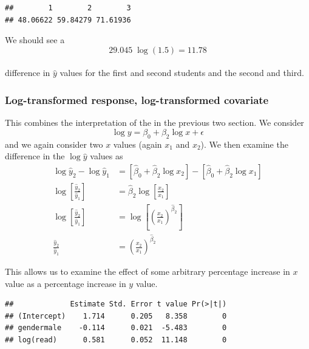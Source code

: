 \documentclass[]{book}
\newenvironment{Shaded}{\begin{snugshade}}{\end{snugshade}}
\newcommand{\KeywordTok}[1]{\textcolor[rgb]{0.13,0.29,0.53}{\textbf{{#1}}}}
\newcommand{\DataTypeTok}[1]{\textcolor[rgb]{0.13,0.29,0.53}{{#1}}}
\newcommand{\DecValTok}[1]{\textcolor[rgb]{0.00,0.00,0.81}{{#1}}}
\newcommand{\StringTok}[1]{\textcolor[rgb]{0.31,0.60,0.02}{{#1}}}
\newcommand{\NormalTok}[1]{{#1}}
\theoremstyle{definition}
\theoremstyle{definition}
\theoremstyle{remark}
\begin{document}
\begin{verbatim}
##        1        2        3 
## 48.06622 59.84279 71.61936
\end{verbatim}

We should see a \[29.045 \; \log \left( 1.5 \right) = 11.78\]\\
difference in \(\hat{y}\) values for the first and second students and
the second and third.

\subsubsection{Log-transformed response, log-transformed
covariate}\label{log-transformed-response-log-transformed-covariate}

This combines the interpretation of the in the previous two section. We
consider \[\log y=\beta_{0}+\beta_{2}\log x+\epsilon\] and we again
consider two \(x\) values (again \(x_{1}\) and \(x_{2}\)). We then
examine the difference in the \(\log\hat{y}\) values as
\[\begin{aligned}
\log\hat{y}_{2}-\log\hat{y}_{1} &= \left[\hat{\beta}_{0}+\hat{\beta}_{2}\log x_{2}\right]-\left[\hat{\beta}_{0}+\hat{\beta}_{2}\log x_{1}\right] \\
\log\left[\frac{\hat{y}_{2}}{\hat{y}_{1}}\right]    &=  \hat{\beta}_{2}\log\left[\frac{x_{2}}{x_{1}}\right] \\
\log\left[\frac{\hat{y}_{2}}{\hat{y}_{1}}\right]    &=  \log\left[\left(\frac{x_{2}}{x_{1}}\right)^{\hat{\beta}_{2}}\right] \\
\frac{\hat{y}_{2}}{\hat{y}_{1}} &=  \left(\frac{x_{2}}{x_{1}}\right)^{\hat{\beta}_{2}}
\end{aligned}\]

This allows us to examine the effect of some arbitrary percentage
increase in \(x\) value as a percentage increase in \(y\) value.

\begin{Shaded}
\end{Shaded}

\begin{verbatim}
##             Estimate Std. Error t value Pr(>|t|)
## (Intercept)    1.714      0.205   8.358        0
## gendermale    -0.114      0.021  -5.483        0
## log(read)      0.581      0.052  11.148        0
\end{verbatim}
\end{document}
